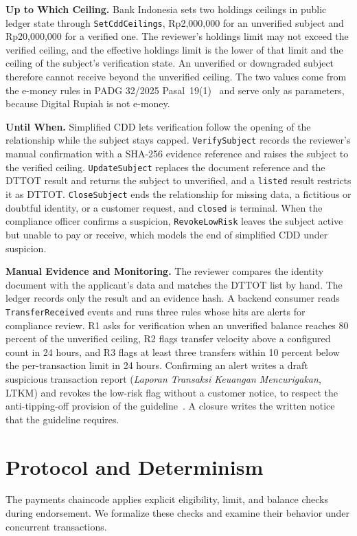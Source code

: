 \documentclass[conference]{IEEEtran}
\begin{document}
\textbf{Up to Which Ceiling.} Bank Indonesia sets two holdings ceilings in public
ledger state through \texttt{SetCddCeilings}, Rp2,000,000 for an unverified subject
and Rp20,000,000 for a verified one. The reviewer's holdings limit may not exceed the
verified ceiling, and the effective holdings limit is the lower of that limit and the
ceiling of the subject's verification state. An unverified or downgraded subject
therefore cannot receive beyond the unverified ceiling. The two values come from the
e-money rules in PADG 32/2025 Pasal~19(1)~\cite{bi2025padg32} and serve only as
parameters, because Digital Rupiah is not e-money.

\textbf{Until When.} Simplified CDD lets verification follow the opening of the
relationship while the subject stays capped. \texttt{VerifySubject} records the
reviewer's manual confirmation with a SHA-256 evidence reference and raises the
subject to the verified ceiling. \texttt{UpdateSubject} replaces the document
reference and the DTTOT result and returns the subject to unverified, and a
\texttt{listed} result restricts it as DTTOT. \texttt{CloseSubject} ends the
relationship for missing data, a fictitious or doubtful identity, or a customer
request, and \texttt{closed} is terminal. When the compliance officer confirms a
suspicion, \texttt{RevokeLowRisk} leaves the subject active but unable to pay or
receive, which models the end of simplified CDD under suspicion.

\textbf{Manual Evidence and Monitoring.} The reviewer compares the identity document
with the applicant's data and matches the DTTOT list by hand. The ledger records
only the result and an evidence hash. A backend consumer reads
\texttt{TransferReceived} events and runs three rules whose hits are alerts for
compliance review. R1 asks for verification when an unverified balance reaches
80 percent of the unverified ceiling, R2 flags transfer velocity above a configured
count in 24 hours, and R3 flags at least three transfers within 10 percent below the
per-transaction limit in 24 hours. Confirming an alert writes a draft suspicious
transaction report (\emph{Laporan Transaksi Keuangan Mencurigakan}, LTKM) and
revokes the low-risk flag without a customer notice, to respect the anti-tipping-off
provision of the guideline~\cite{bi2023pedoman}. A closure writes the written notice
that the guideline requires.

\section{Protocol and Determinism}
\label{sec:proto}
The payments chaincode applies explicit eligibility, limit, and balance checks
during endorsement. We formalize these checks and examine their behavior under
concurrent transactions.
\end{document}
